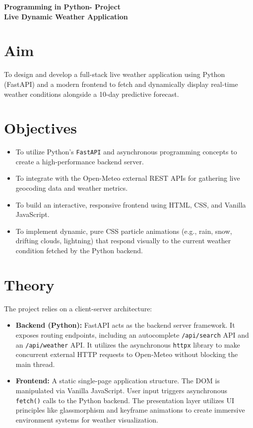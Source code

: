 \documentclass[12pt,a4paper]{article}
\begin{document}
\begin{center}
    {\Huge \textbf{Programming in Python- Project}}\\[1cm]
    {\LARGE \textbf{Live Dynamic Weather Application}}\\[1.5cm]
\end{center}

\section*{Aim}
To design and develop a full-stack live weather application using Python (FastAPI) and a modern frontend to fetch and dynamically display real-time weather conditions alongside a 10-day predictive forecast.

\section*{Objectives}
\begin{itemize}
    \item To utilize Python's \texttt{FastAPI} and asynchronous programming concepts to create a high-performance backend server.
    \item To integrate with the Open-Meteo external REST APIs for gathering live geocoding data and weather metrics.
    \item To build an interactive, responsive frontend using HTML, CSS, and Vanilla JavaScript.
    \item To implement dynamic, pure CSS particle animations (e.g., rain, snow, drifting clouds, lightning) that respond visually to the current weather condition fetched by the Python backend.
\end{itemize}

\section*{Theory}
The project relies on a client-server architecture:
\begin{itemize}
    \item \textbf{Backend (Python):} FastAPI acts as the backend server framework. It exposes routing endpoints, including an autocomplete \texttt{/api/search} API and an \texttt{/api/weather} API. It utilizes the asynchronous \texttt{httpx} library to make concurrent external HTTP requests to Open-Meteo without blocking the main thread.
    \item \textbf{Frontend:} A static single-page application structure. The DOM is manipulated via Vanilla JavaScript. User input triggers asynchronous \texttt{fetch()} calls to the Python backend. The presentation layer utilizes UI principles like glassmorphism and keyframe animations to create immersive environment systems for weather visualization.
\end{itemize}
\end{document}
